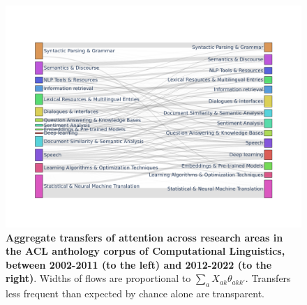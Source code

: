 \documentclass{article}
\begin{document}
 \begin{figure}[h]
     \centering
     \includegraphics[width=\textwidth]{Fig20.pdf}
     \caption{\textbf{Aggregate transfers of attention across research areas in the ACL anthology corpus of Computational Linguistics, between 2002-2011 (to the left) and 2012-2022 (to the right)}. Widths of flows are proportional to $\sum_a X_{ak}\theta_{akk'}$. Transfers less frequent than expected by chance alone are transparent. }
     \label{fig:sankey_acl}
 \end{figure}

\end{document}

